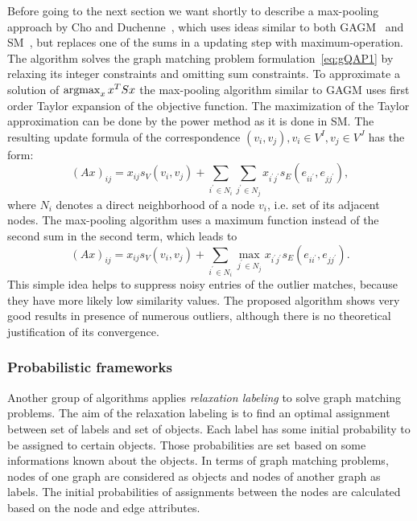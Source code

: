 Before going to the next section we want shortly to describe a max-pooling approach by Cho and Duchenne~\cite{Cho2014_Haystack}, which uses ideas similar to both GAGM~\cite{Rangarajan1996_GAGM} and SM~\cite{Leordeanu2005_SM}, but replaces one of the sums in a updating step with maximum-operation. The algorithm solves the graph matching problem formulation~\eqref{eq:gQAP1} by relaxing its integer constraints and omitting sum constraints. To approximate a solution of $\mathop{\rm argmax}_{x}x^TSx$ the max-pooling algorithm similar to GAGM uses first order Taylor expansion of the objective function. The maximization of the Taylor approximation can be done by the power method as it is done in SM.
The resulting update formula of the correspondence $(v_i,v_j),v_i\in V^I,v_j\in V^J$ has the form:
\begin{equation}
(Ax)_{ij}=x_{ij}s_V(v_i,v_{j})+\sum_{i^\prime\in N_i}\sum_{j^\prime\in N_j}x_{i^\prime j^\prime}s_E(e_{ii^\prime},e_{jj^\prime}),
\end{equation}
where $N_i$ denotes a direct neighborhood of a node $v_i$, i.e. set of its adjacent nodes.
The max-pooling algorithm uses a maximum function instead of the second sum in the second term, which leads to
\begin{equation}
(Ax)_{ij}=x_{ij}s_V(v_i,v_{j})+\sum_{i^\prime\in N_i}\max_{j^\prime\in N_j}x_{i^\prime j^\prime}s_E(e_{ii^\prime},e_{jj^\prime}).
\end{equation}
This simple idea helps to suppress noisy entries of the outlier matches, because they have more likely low similarity values. The proposed algorithm shows very good results in presence of numerous outliers, although there is no theoretical justification of its convergence.
\subsubsection{Probabilistic frameworks}
Another group of algorithms applies \emph{relaxation labeling} to solve graph matching problems. The aim of the relaxation labeling is to find an optimal assignment between set of labels and set of objects. Each label has some initial probability to be assigned to certain objects. Those probabilities are set based on some informations known about the objects. In terms of graph matching problems, nodes of one graph are considered as objects and nodes of another graph as labels. The initial probabilities of assignments between the nodes are calculated  based on the node and edge attributes. 

